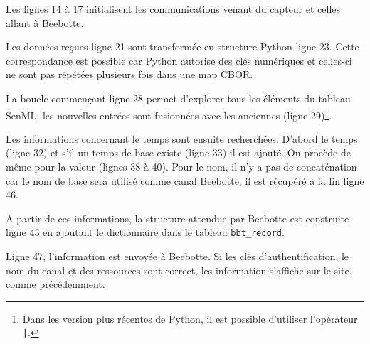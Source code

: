  Les lignes 14 à 17 initialisent les communications venant du capteur et celles allant à Beebotte. 
 
 Les données reçues ligne 21 sont transformée en structure Python ligne 23. Cette correspondance est possible car Python autorise des clés numériques et celles-ci ne sont pas répétées plusieurs fois dans une map CBOR.
 
La boucle commençant ligne 28 permet d'explorer tous les éléments du tableau SenML, les nouvelles entrées sont fusionnées avec les anciennes (ligne 29)\footnote{Dans les version plus récentes de Python, il est possible d'utiliser l'opérateur \texttt{|}.}. 

Les informations concernant le temps sont ensuite recherchées. 
D'abord le temps (ligne 32) et s'il un temps de base existe (ligne 33) il est ajouté. On procède de même pour la valeur (lignes 38 à 40). Pour le nom, il n'y a pas de concaténation car le nom de base sera utilisé comme canal Beebotte, il est récupéré à la fin ligne 46.

A partir de ces informations, la structure attendue par Beebotte est construite ligne 43 en ajoutant le dictionnaire dans le tableau \texttt{bbt\_record}.

Ligne 47, l'information est envoyée à Beebotte. Si les clés d'authentification, le nom du canal et des ressources sont correct, les information s'affiche sur le site, comme précédemment. 


